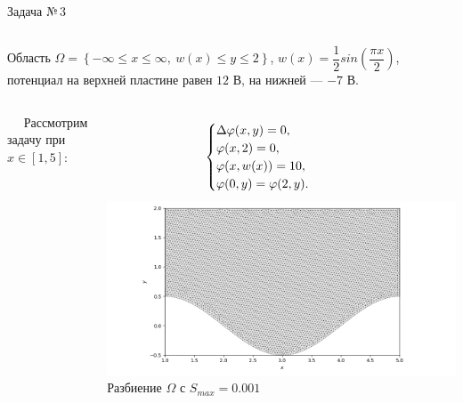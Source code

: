 \documentclass[ignoreonframetext,xcolor=table, unicode, 10pt]{beamer}
\renewcommand{\phi}{\varphi}
\begin{document}
\begin{frame}{Задача №\,3}
	\normalsize
	\vspace*{2mm}
	\begin{columns}[]
		Область $\Omega = \left\{ -\infty \leqslant x \leqslant \infty, \  w(x) \leqslant y \leqslant 2 \right\}$, $w(x) = \dfrac{1}{2} sin \left(\dfrac{\pi x}{2} \right)$,
		потенциал на верхней пластине равен $12$ В, на нижней --- $-7$ В.
		
	\end{columns}
	\vspace*{5mm}
	\begin{columns}[]
		\ \ \! Рассмотрим задачу при $x \in \left[ 1, 5 \right]$:
		
		\begin{equation*}\hspace*{-10mm}
			\begin{cases}
				\Delta \phi (x, y)  = 0, \\
				\phi (x, 2) = 0, \\
				\phi (x, w(x)) = 10, \\
				\phi (0, y) = \phi (2, y).\\
			\end{cases}
		\end{equation*}
		\vspace*{-2mm}
		\centering \hspace*{-16mm}
		\includegraphics[width=1.1\columnwidth]{Test_domain_1_1_sin_mesh_0001_calfem_net_1.png}\\
		\hspace*{-14.5mm} Разбиение $\Omega$ с $S_{max} = 0.001$
		

\end{columns}
\end{frame}
\end{document}
